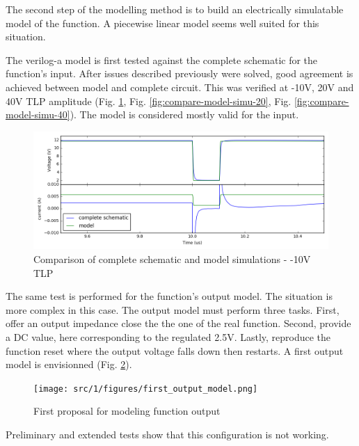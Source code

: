 The second step of the modelling method is to build an electrically simulatable model of the function.
A piecewise linear model seems well suited for this situation.


The verilog-a model is first tested against the complete schematic for the function's input.
After issues described previously were solved, good agreement is achieved between model and complete circuit.
This was verified at -10V, 20V and 40V TLP amplitude (Fig. \ref{fig:compare-model-simu-m10}, Fig. \ref{fig:compare-model-simu-20}, Fig. \ref{fig:compare-model-simu-40}).
The model is considered mostly valid for the input.

\begin{figure}[!h]
  \centering
  \includegraphics[width=\textwidth]{src/1/figures/comparison_model_total_m10V.png}
  \caption{Comparison of complete schematic and model simulations - -10V TLP}
  \label{fig:compare-model-simu-m10}
\end{figure}


The same test is performed for the function's output model.
The situation is more complex in this case.
The output model must perform three tasks.
First, offer an output impedance close the the one of the real function.
Second, provide a DC value, here corresponding to the regulated 2.5V.
Lastly, reproduce the function reset where the output voltage falls down then restarts.
A first output model is envisionned (Fig. \ref{fig:first-output-model}).

\begin{figure}[!h]
  \centering
  \texttt{[image: src/1/figures/first\_output\_model.png]}
  \caption{First proposal for modeling function output}
  \label{fig:first-output-model}
\end{figure}

Preliminary and extended tests show that this configuration is not working.

